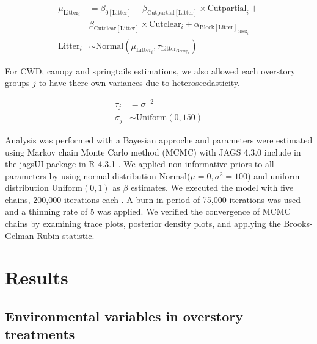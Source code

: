 \begin{align}
  \mu_{\text{Litter}_i} &= 
  \beta_{0[\text{Litter}]} + \beta_{\text{Cutpartial}[\text{Litter}]} \times \text{Cutpartial}_{i} + \nonumber\\
  & \beta_{\text{Cutclear}[\text{Litter}]} \times \text{Cutclear}_{i} + \alpha_{\text{Block}[\text{Litter}]_{\text{block}_i}} \\
  \text{Litter}_{i} &\sim 
  \text{Normal} (\mu_{\text{Litter}_i}, \tau_{\text{Litter}_{\text{Group}_i}}) \nonumber 
\end{align}

\vspace{0.5cm}

For CWD, canopy and springtails estimations, we also allowed each overstory groups $j$ to have there own variances due to heteroscedasticity.

\begin{align}
  \tau_j &= \sigma^{-2} \\
  \sigma_j &\sim \text{Uniform}(0,150) \nonumber
\end{align}


Analysis was performed with a Bayesian approche and parameters were estimated using Markov chain Monte Carlo method (MCMC) with JAGS 4.3.0 include in the jagsUI package in R 4.3.1 \citep{lunnBUGSProjectEvolution2009,kellnerJagsUIWrapperRjags2024,rcoreteamLanguageEnvironmentStatistical2020}.
We applied non-informative priors to all parameters by using normal distribution $\text{Normal}(\mu = 0, \sigma^2 = 100$) and uniform distribution $\text{Uniform}(0,1)$ as $\beta$ estimates. 
We executed the model with five chains, 200,000 iterations each \citep{gelmanUnderstandingPredictiveInformation2014}. A burn-in period of 75,000 iterations was used and a thinning rate of 5 was applied. 
We verified the convergence of MCMC chains by examining trace plots, posterior density plots, and applying the Brooks-Gelman-Rubin statistic.

\clearpage



\section*{Results}
\label{sec:results1}

\subsection*{Environmental variables in overstory treatments}
\label{subsec:ResEnv}

